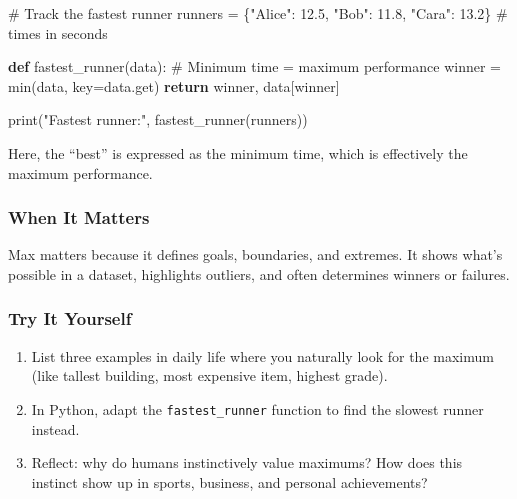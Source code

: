 \documentclass[
  letterpaper,
  DIV=11,
  numbers=noendperiod]{scrreprt}
\newenvironment{Shaded}{\begin{snugshade}}{\end{snugshade}}
\newcommand{\BuiltInTok}[1]{\textcolor[rgb]{0.00,0.23,0.31}{#1}}
\newcommand{\CommentTok}[1]{\textcolor[rgb]{0.37,0.37,0.37}{#1}}
\newcommand{\ControlFlowTok}[1]{\textcolor[rgb]{0.00,0.23,0.31}{\textbf{#1}}}
\newcommand{\FloatTok}[1]{\textcolor[rgb]{0.68,0.00,0.00}{#1}}
\newcommand{\KeywordTok}[1]{\textcolor[rgb]{0.00,0.23,0.31}{\textbf{#1}}}
\newcommand{\NormalTok}[1]{\textcolor[rgb]{0.00,0.23,0.31}{#1}}
\newcommand{\OperatorTok}[1]{\textcolor[rgb]{0.37,0.37,0.37}{#1}}
\newcommand{\StringTok}[1]{\textcolor[rgb]{0.13,0.47,0.30}{#1}}
\providecommand{\tightlist}{%
  \setlength{\itemsep}{0pt}\setlength{\parskip}{0pt}}
\begin{document}
\begin{Shaded}
\begin{Highlighting}[]
\CommentTok{\# Track the fastest runner}
\NormalTok{runners }\OperatorTok{=}\NormalTok{ \{}\StringTok{"Alice"}\NormalTok{: }\FloatTok{12.5}\NormalTok{, }\StringTok{"Bob"}\NormalTok{: }\FloatTok{11.8}\NormalTok{, }\StringTok{"Cara"}\NormalTok{: }\FloatTok{13.2}\NormalTok{\}  }\CommentTok{\# times in seconds}

\KeywordTok{def}\NormalTok{ fastest\_runner(data):}
    \CommentTok{\# Minimum time = maximum performance}
\NormalTok{    winner }\OperatorTok{=} \BuiltInTok{min}\NormalTok{(data, key}\OperatorTok{=}\NormalTok{data.get)}
    \ControlFlowTok{return}\NormalTok{ winner, data[winner]}

\BuiltInTok{print}\NormalTok{(}\StringTok{"Fastest runner:"}\NormalTok{, fastest\_runner(runners))}
\end{Highlighting}
\end{Shaded}

Here, the ``best'' is expressed as the minimum time, which is
effectively the maximum performance.

\subsubsection{When It Matters}\label{when-it-matters-92}

Max matters because it defines goals, boundaries, and extremes. It shows
what's possible in a dataset, highlights outliers, and often determines
winners or failures.

\subsubsection{Try It Yourself}\label{try-it-yourself-94}

\begin{enumerate}
\def\labelenumi{\arabic{enumi}.}
\tightlist
\item
  List three examples in daily life where you naturally look for the
  maximum (like tallest building, most expensive item, highest grade).
\item
  In Python, adapt the \texttt{fastest\_runner} function to find the
  slowest runner instead.
\item
  Reflect: why do humans instinctively value maximums? How does this
  instinct show up in sports, business, and personal achievements?
\end{enumerate}
\end{document}
